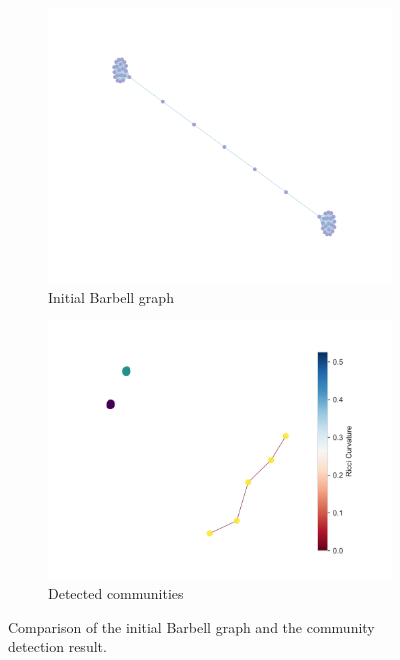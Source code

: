 \begin{figure}[ht]
    \centering
    \begin{subfigure}[b]{0.45\textwidth}
        \centering
        \includegraphics[width=\textwidth]{Graphics/ToyModelResults/Barbell_resluts/BeforeRicciFlow.png}
        \caption{Initial Barbell graph}
        \label{fig:barbell_initial}
    \end{subfigure}
    \hfill
    \begin{subfigure}[b]{0.45\textwidth}
        \centering
        \includegraphics[width=\textwidth]{Graphics/ToyModelResults/Barbell_resluts/Communities.png}
        \caption{Detected communities}
        \label{fig:barbell_result}
    \end{subfigure}
    \caption{Comparison of the initial Barbell graph and the community detection result.}
    \label{fig3}
\end{figure}

